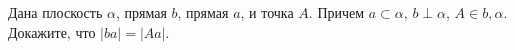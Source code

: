 Дана плоскость $\alpha$, прямая $b$, прямая $a$, и точка $A$. Причем $a\subset\alpha$, $b\perp\alpha$, $A\in b, \alpha$. Докажите, что $|ba|=|Aa|$.